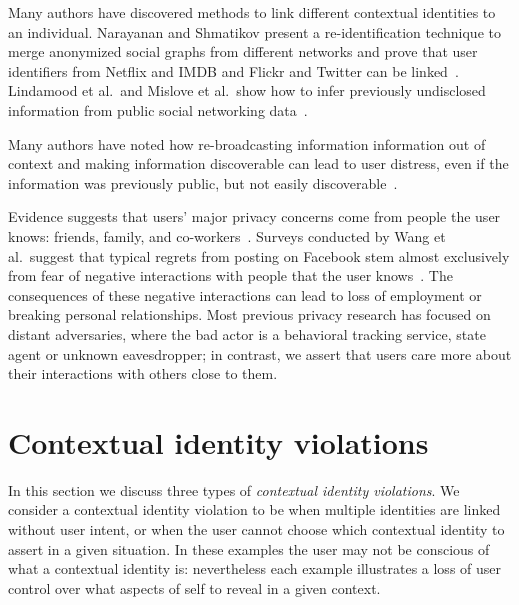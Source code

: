 \documentclass[10pt, conference, compsocconf]{IEEEtran}
\begin{document}
Many authors have discovered methods to link different contextual identities to
an individual. Narayanan and Shmatikov present a re-identification technique
to merge anonymized social graphs from different networks and prove that
user identifiers from Netflix and IMDB and Flickr and Twitter can be
linked~\cite{narayanan1,narayanan2}. Lindamood et al.~and Mislove et al.~show
how to infer previously undisclosed information from public social networking
data~\cite{lindamood,mislove}.

Many authors have noted how re-broadcasting information information out of
context and making information discoverable can lead to user distress, even if
the information was previously public, but not easily
discoverable~\cite{boyd1,chew,nissenbaum}.

Evidence suggests that users' major privacy concerns come from people the user
knows: friends, family, and co-workers~\cite{fbtips2,fbtips1}.  Surveys
conducted by Wang et al.~suggest that typical regrets from posting on Facebook
stem almost exclusively from fear of negative interactions with people that the
user knows~\cite{wang}. The consequences of these negative interactions can
lead to loss of employment or breaking personal relationships.  Most previous
privacy research has focused on distant adversaries, where the bad actor is a
behavioral tracking service, state agent or unknown eavesdropper; in contrast,
we assert that users care more about their interactions with others close to
them.

\section{Contextual identity violations}
In this section we discuss three types of \textit{contextual identity
violations}. We consider a contextual identity violation to be when multiple
identities are linked without user intent, or when the user cannot choose which
contextual identity to assert in a given situation. In these examples the user
may not be conscious of what a contextual identity is: nevertheless each
example illustrates a loss of user control over what aspects of self to
reveal in a given context.

\label{sec:examples}
\end{document}
